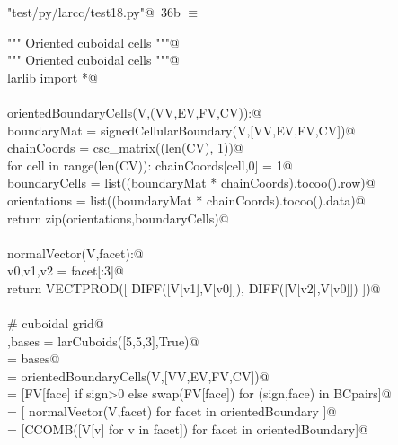 \documentclass[11pt,oneside]{article}    %
\begin{document}
\begin{flushleft} \small \label{scrap58}
\protect{}\verb@"test/py/larcc/test18.py"@\nobreak\ {\footnotesize 36b }$\equiv$
\vspace{-1ex}
\begin{list}{}{} \item
\mbox{}\verb@""" Oriented cuboidal cells """@\\
\mbox{}\verb@""" Oriented cuboidal cells """@\\
\mbox{}\verb@from larlib import *@\\
\mbox{}\verb@@\\
\mbox{}\verb@def orientedBoundaryCells(V,(VV,EV,FV,CV)):@\\
\mbox{}\verb@    boundaryMat = signedCellularBoundary(V,[VV,EV,FV,CV])@\\
\mbox{}\verb@    chainCoords = csc_matrix((len(CV), 1))@\\
\mbox{}\verb@    for cell in range(len(CV)): chainCoords[cell,0] = 1@\\
\mbox{}\verb@    boundaryCells = list((boundaryMat * chainCoords).tocoo().row)@\\
\mbox{}\verb@    orientations = list((boundaryMat * chainCoords).tocoo().data)@\\
\mbox{}\verb@    return zip(orientations,boundaryCells)@\\
\mbox{}\verb@@\\
\mbox{}\verb@def normalVector(V,facet):@\\
\mbox{}\verb@    v0,v1,v2 = facet[:3]@\\
\mbox{}\verb@    return VECTPROD([ DIFF([V[v1],V[v0]]), DIFF([V[v2],V[v0]]) ])@\\
\mbox{}\verb@@\\
\mbox{}\verb@# cuboidal grid@\\
\mbox{}\verb@V,bases = larCuboids([5,5,3],True)@\\
\mbox{}\verb@[VV,EV,FV,CV] = bases@\\
\mbox{}\verb@BCpairs = orientedBoundaryCells(V,[VV,EV,FV,CV])@\\
\mbox{}\verb@orientedBoundary = [FV[face] if sign>0 else swap(FV[face]) for (sign,face) in BCpairs]@\\
\mbox{}\verb@normals = [ normalVector(V,facet)  for facet in orientedBoundary ]@\\
\mbox{}\verb@facetCentroids = [CCOMB([V[v] for v in facet]) for facet in orientedBoundary]@\\

\end{list}
\end{flushleft}
\end{document}

